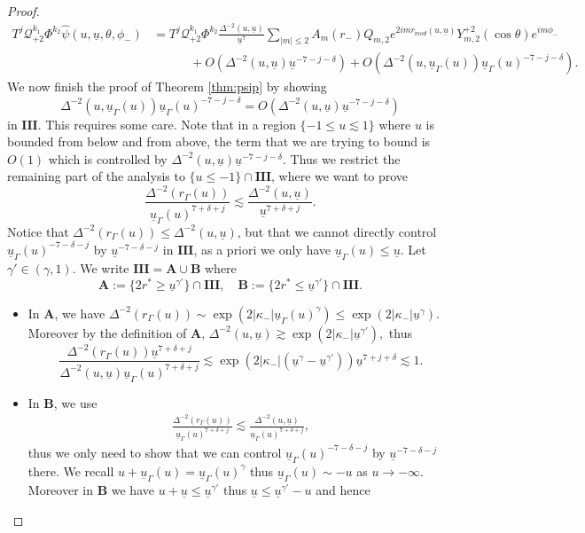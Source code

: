 \documentclass[reqno]{amsart}
\numberwithin{equation}{section}
\newcommand{\mcq}{\mathcal{Q}}
\newcommand{\ubar}{{\underline{u}}}
\newcommand{\carterp}{\mcq_{+2}}
\newcommand{\psihat}{\widehat{\psi}}
\newcommand{\trois}{\mathbf{III}}
\newcommand{\sfrak}{2}
\theoremstyle{plain}
\theoremstyle{definition}
\theoremstyle{remark}
\numberwithin{equation}{section}
\begin{document}
\begin{proof}
\begin{align*}
    T^j\carterp^{k_1}\Phi^{k_2}\psihat(u,\ubar,\theta,\phi_{-})&=T^j\carterp^{k_1}\Phi^{k_2}\frac{\Delta^{-2}(u,\ubar)}{\ubar^7}\sum_{|m|\leq 2}A_m(r_-)Q_{m,2}e^{2imr_{mod}(u,\ubar)}Y_{m,\sfrak}^{+\sfrak}(\cos\theta)e^{im\phi_{-}}\\
    &\quad\quad\quad+O(\Delta^{-2}(u,\ubar)\ubar^{-7-j-\delta})+O(\Delta^{-2}(u,\ubar_\Gamma(u))\ubar_\Gamma(u)^{-7-j-\delta}).
\end{align*}
We now finish the proof of Theorem \ref{thm:psip} by showing 
$$\Delta^{-2}(u,\ubar_\Gamma(u))\ubar_\Gamma(u)^{-7-j-\delta}=O(\Delta^{-2}(u,\ubar)\ubar^{-7-j-\delta})$$
in $\trois$. This requires some care. Note that in a region $\{-1\leq u\lesssim 1\}$ where $u$ is bounded from below and from above, the term that we are trying to bound is $O(1)$ which is controlled by $\Delta^{-2}(u,\ubar)\ubar^{-7-j-\delta}$. Thus we restrict the remaining part of the analysis to $\{u\leq -1\}\cap\trois$, where we want to prove
$$\frac{\Delta^{-2}(r_\Gamma(u))}{\ubar_\Gamma(u)^{7+\delta+j}}\lesssim\frac{\Delta^{-2}(u,\ubar)}{\ubar^{7+\delta+j}}.$$
Notice that $\Delta^{-2}(r_\Gamma(u))\leq\Delta^{-2}(u,\ubar)$, but that we cannot directly control $\ubar_\Gamma(u)^{-7-\delta-j}$ by $\ubar^{-7-\delta-j}$ in $\trois$, as a priori we only have $\ubar_\Gamma(u)\leq\ubar$. Let $\gamma'\in(\gamma,1)$. We write $\trois=\mathbf{A}\cup\mathbf{B}$ where 
$$\mathbf{A}:=\{2r^*\geq\ubar^{\gamma'}\}\cap\trois,\quad\mathbf{B}:=\{2r^*\leq\ubar^{\gamma'}\}\cap\trois.$$ 
\begin{itemize}
    \item In $\mathbf{A}$, we have $\Delta^{-2}(r_\Gamma(u))\sim\exp(2|\kappa_-|\ubar_\Gamma(u)^\gamma)\leq \exp(2|\kappa_-|\ubar^\gamma)$. Moreover by the definition of $\mathbf{A}$, $\Delta^{-2}(u,\ubar)\gtrsim\exp(2|\kappa_-|\ubar^{\gamma'}),$
    thus 
    $$\frac{\Delta^{-2}(r_\Gamma(u))\ubar^{7+\delta+j}}{\Delta^{-2}(u,\ubar)\ubar_\Gamma(u)^{7+\delta+j}}\lesssim\exp(2|\kappa_-|(\ubar^\gamma-\ubar^{\gamma'}))\ubar^{7+j+\delta}\lesssim 1.$$
    \item In $\mathbf{B}$, we use
    \begin{align}\label{eqn:derrr}
        \frac{\Delta^{-2}(r_\Gamma(u))}{\ubar_\Gamma(u)^{7+\delta+j}}\lesssim\frac{\Delta^{-2}(u,\ubar)}{\ubar_\Gamma(u)^{7+\delta+j}},
    \end{align}
    thus we only need to show that we can control $\ubar_\Gamma(u)^{-7-\delta-j}$ by $\ubar^{-7-\delta-j}$ there. We recall $u+\ubar_\Gamma(u)=\ubar_\Gamma(u)^\gamma$ thus $\ubar_\Gamma(u)\sim -u$ as $u\to-\infty$. Moreover in $\mathbf{B}$ we have $u+\ubar\leq\ubar^{\gamma'}$ thus $\ubar\leq\ubar^{\gamma'}-u$ and hence 

\end{itemize}
\end{proof}
\end{document}
